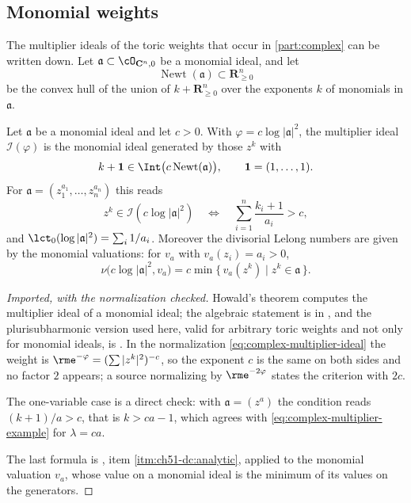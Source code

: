 \subsection{Monomial weights}
\label{sec:ch51-howald}

The multiplier ideals of the toric weights that occur in
\cref{part:complex} can be written down.  Let
\(\mathfrak a\subset\cO_{\mathbf C^n,0}\) be a monomial ideal, and let
\[
 \operatorname{Newt}(\mathfrak a)
 \subset\mathbf R^n_{\geq0}
\]
be the convex hull of the union of \(k+\mathbf R^n_{\geq0}\) over the
exponents \(k\) of monomials in \(\mathfrak a\).

\begin{proposition}\label{prop:ch51-howald}
Let \(\mathfrak a\) be a monomial ideal and let \(c>0\).  With
\(\varphi=c\log|\mathfrak a|^2\), the multiplier ideal
\(\mathcal I(\varphi)\) is the monomial ideal generated by those \(z^k\)
with
\[
 k+\mathbf 1\in\Int\bigl(c\operatorname{Newt}(\mathfrak a)\bigr),
 \qquad \mathbf 1=(1,\ldots,1).
\]
For \(\mathfrak a=(z_1^{a_1},\ldots,z_n^{a_n})\) this reads
\[
 z^k\in\mathcal I(c\log|\mathfrak a|^2)
 \quad\Longleftrightarrow\quad
 \sum_{i=1}^n\frac{k_i+1}{a_i}>c ,
\]
and \(\lct_0(\log|\mathfrak a|^2)=\sum_i1/a_i\).  Moreover the divisorial
Lelong numbers are given by the monomial valuations: for \(v_a\) with
\(v_a(z_i)=a_i>0\),
\[
 \nu\bigl(c\log|\mathfrak a|^2,v_a\bigr)
 =c\min\{\,v_a(z^k)\mid z^k\in\mathfrak a\,\}.
\]
\end{proposition}

\begin{proof}[Imported, with the normalization checked]
Howald's theorem computes the multiplier ideal of a monomial ideal; the
algebraic statement is in \cite{PAG2}, and the plurisubharmonic version
used here, valid for arbitrary toric weights and not only for monomial
ideals, is \cite{Guenancia12}.  In the normalization
\eqref{eq:complex-multiplier-ideal} the weight is
\(\rme^{-\varphi}=(\sum|z^{k}|^2)^{-c}\), so the exponent \(c\) is the
same on both sides and no factor \(2\) appears; a source normalizing by
\(\rme^{-2\varphi}\) states the criterion with \(2c\).

The one-variable case is a direct check: with
\(\mathfrak a=(z^{a})\) the condition reads \((k+1)/a>c\), that is
\(k>ca-1\), which agrees with
\eqref{eq:complex-multiplier-example} for \(\lambda=ca\).

The last formula is , item
\cref{itm:ch51-dc:analytic}, applied to the monomial valuation \(v_a\),
whose value on a monomial ideal is the minimum of its values on the
generators.
\end{proof}

